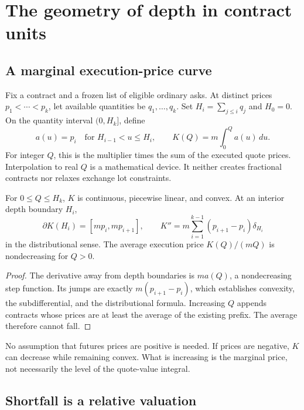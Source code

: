 \section{The geometry of depth in contract units}
\label{sec:depth}

\subsection{A marginal execution-price curve}

Fix a contract and a frozen list of eligible ordinary asks. At distinct prices $p_1<\cdots<p_k$, let available quantities be $q_1,\ldots,q_k$. Set $H_i=\sum_{j\le i}q_j$ and $H_0=0$. On the quantity interval $(0,H_k]$, define
\begin{equation}
 a(u)=p_i\quad\text{for }H_{i-1}<u\le H_i,
 \qquad K(Q)=m\int_0^Q a(u)\,du.
\label{eq:depth}
\end{equation}
For integer $Q$, this is the multiplier times the sum of the executed quote prices. Interpolation to real $Q$ is a mathematical device. It neither creates fractional contracts nor relaxes exchange lot constraints.

\begin{proposition}\label{prop:depth}
For $0\le Q\le H_k$, $K$ is continuous, piecewise linear, and convex. At an interior depth boundary $H_i$,
\begin{equation}
 \partial K(H_i)=[mp_i,mp_{i+1}],
 \qquad K''=m\sum_{i=1}^{k-1}(p_{i+1}-p_i)\delta_{H_i}
\end{equation}
in the distributional sense. The average execution price $K(Q)/(mQ)$ is nondecreasing for $Q>0$.
\end{proposition}
\begin{proof}
The derivative away from depth boundaries is $ma(Q)$, a nondecreasing step function. Its jumps are exactly $m(p_{i+1}-p_i)$, which establishes convexity, the subdifferential, and the distributional formula. Increasing $Q$ appends contracts whose prices are at least the average of the existing prefix. The average therefore cannot fall.
\end{proof}

No assumption that futures prices are positive is needed. If prices are negative, $K$ can decrease while remaining convex. What is increasing is the marginal price, not necessarily the level of the quote-value integral.

\subsection{Shortfall is a relative valuation}

